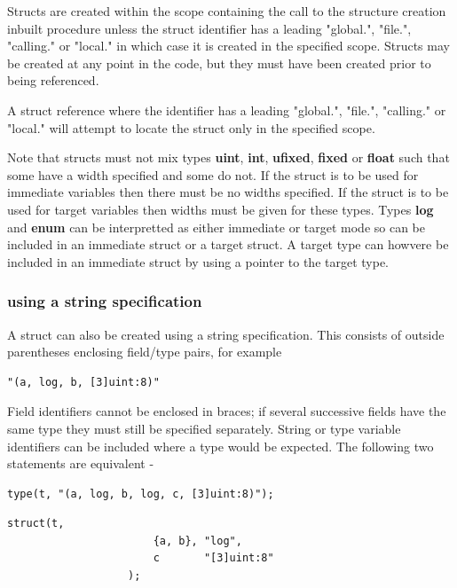                 Structs are created within the scope containing the call to the
                structure creation inbuilt procedure unless the struct identifier
                has a leading "global.", "file.", "calling." or "local." in
                which case it is created in the specified scope. Structs may be
                created at any point in the code, but they must have been
                created prior to being referenced.

                A struct reference where the identifier has a leading "global.",
                "file.", "calling." or "local." will attempt to locate the
                struct only in the specified scope.

                Note that structs must not mix types {\bf uint}, {\bf int}, {\bf
                ufixed}, {\bf fixed} or {\bf float} such that some have a width
                specified and some do not. If the struct is to be used for
                immediate variables then there must be no widths specified. If the
                struct is to be used for target variables then widths must be
                given for these types. Types {\bf log} and {\bf enum} can be
                interpretted as either immediate or target mode so can be included
                in an immediate struct or a target struct. A target type can
                howvere be included in an immediate struct by using a pointer to
                the target type.

            \subsubsection{using a string specification}
            
                A struct can also be created using a string specification. This
                consists of outside parentheses enclosing field/type pairs, for
                example
                \begin{lstlisting}[gobble=16, language=threepl]
                   "(a, log, b, [3]uint:8)"
                \end{lstlisting}
                Field identifiers cannot be enclosed in braces; if several
                successive fields have the same type they must still be
                specified separately. String or type variable identifiers can
                be included where a type would be expected. The following two
                statements are equivalent -
                \begin{lstlisting}[gobble=16, language=threepl]
                   type(t, "(a, log, b, log, c, [3]uint:8)");
                \end{lstlisting}
                \begin{lstlisting}[gobble=16, language=threepl]
                   struct(t,
                       {a, b}, "log",
                       c       "[3]uint:8"
                   );
                \end{lstlisting}

